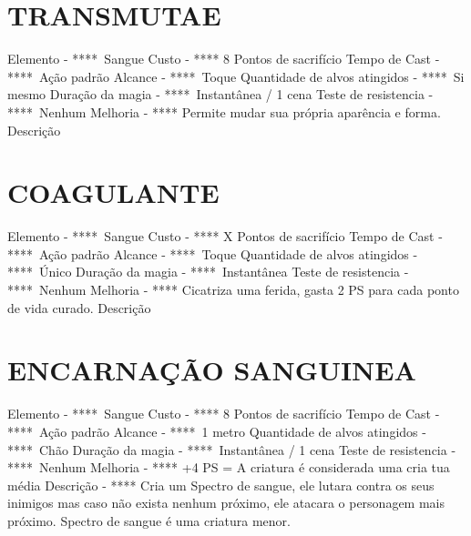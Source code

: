\documentclass{article}%
\begin{document}
\section{TRANSMUTAE}%
\label{sec:TRANSMUTAE}%
Elemento {-} ****~Sangue\newline%
Custo {-} **** 8 Pontos de sacrifício\newline%
Tempo de Cast {-} ****~Ação padrão\newline%
Alcance {-} ****~Toque\newline%
Quantidade de alvos atingidos {-} ****~Si mesmo\newline%
Duração da magia {-} ****~Instantânea / 1 cena\newline%
Teste de resistencia {-} ****~Nenhum\newline%
Melhoria {-} **** Permite mudar sua própria aparência e forma.\newline%
Descrição \newline%

%
\section{COAGULANTE}%
\label{sec:COAGULANTE}%
Elemento {-} ****~Sangue\newline%
Custo {-} **** X Pontos de sacrifício\newline%
Tempo de Cast {-} ****~Ação padrão\newline%
Alcance {-} ****~Toque\newline%
Quantidade de alvos atingidos {-} ****~Único\newline%
Duração da magia {-} ****~Instantânea\newline%
Teste de resistencia {-} ****~Nenhum\newline%
Melhoria {-} **** Cicatriza uma ferida, gasta 2 PS para cada ponto de vida curado.\newline%
Descrição \newline%

%
\section{ENCARNAÇÃO SANGUINEA}%
\label{sec:ENCARNAOSANGUINEA}%
Elemento {-} ****~Sangue\newline%
Custo {-} **** 8 Pontos de sacrifício\newline%
Tempo de Cast {-} ****~Ação padrão\newline%
Alcance {-} ****~1 metro\newline%
Quantidade de alvos atingidos {-} ****~Chão\newline%
Duração da magia {-} ****~Instantânea / 1 cena\newline%
Teste de resistencia {-} ****~Nenhum\newline%
Melhoria {-} **** +4 PS = A criatura é considerada uma cria tua média\newline%
Descrição {-} **** Cria um Spectro de sangue, ele lutara contra os seus inimigos mas caso não exista nenhum próximo, ele atacara o personagem mais próximo. Spectro de sangue é uma criatura menor.\newline%
\end{document}
